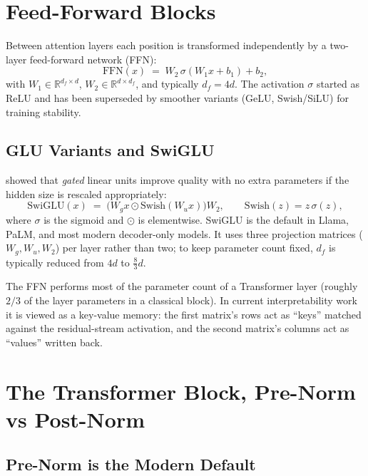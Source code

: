 \section{Feed-Forward Blocks}

Between attention layers each position is transformed independently
by a two-layer feed-forward network (FFN):
\begin{equation}
\label{eq:ch5-ffn-classic}
\mathrm{FFN}(x) \;=\; W_2 \,\sigma(W_1 x + b_1) + b_2,
\end{equation}
with $W_1 \in \mathbb{R}^{d_f \times d}$, $W_2 \in \mathbb{R}^{d \times d_f}$,
and typically $d_f = 4d$. The activation $\sigma$ started as ReLU and
has been superseded by smoother variants (GeLU, Swish/SiLU) for
training stability.

\subsection{GLU Variants and SwiGLU}

\citet{shazeer2020glu} showed that \emph{gated} linear units improve
quality with no extra parameters if the hidden size is rescaled
appropriately:
\begin{equation}
\label{eq:ch5-swiglu}
\mathrm{SwiGLU}(x)
 \;=\; \bigl(W_g x \odot \mathrm{Swish}(W_u x)\bigr) W_2,
\qquad
\mathrm{Swish}(z) = z\,\sigma(z),
\end{equation}
where $\sigma$ is the sigmoid and $\odot$ is elementwise. SwiGLU is
the default in Llama, PaLM, and most modern decoder-only models. It
uses three projection matrices ($W_g, W_u, W_2$) per layer rather
than two; to keep parameter count fixed, $d_f$ is typically reduced
from $4d$ to $\tfrac{8}{3}d$.

The FFN performs most of the parameter count of a Transformer layer
(roughly $2/3$ of the layer parameters in a classical block). In
current interpretability work it is viewed as a key-value memory:
the first matrix's rows act as ``keys'' matched against the
residual-stream activation, and the second matrix's columns act as
``values'' written back.

\section{The Transformer Block, Pre-Norm vs Post-Norm}

\subsection{Pre-Norm is the Modern Default}

